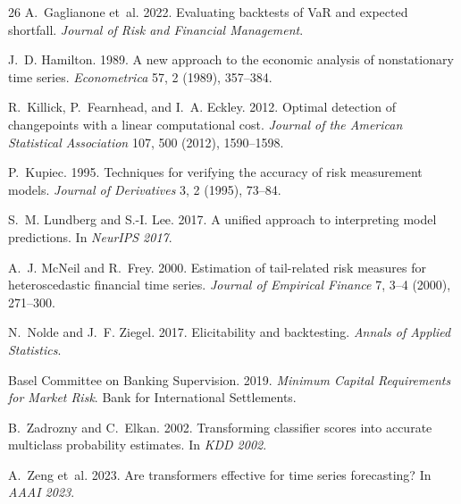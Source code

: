 \documentclass[sigconf]{acmart}
\begin{document}
\begin{thebibliography}{26}
A.~Gaglianone et~al. 2022. Evaluating backtests of VaR and expected shortfall.
\textit{Journal of Risk and Financial Management}.

J.~D. Hamilton. 1989. A new approach to the economic analysis of nonstationary
time series. \textit{Econometrica} 57, 2 (1989), 357--384.

R.~Killick, P.~Fearnhead, and I.~A. Eckley. 2012. Optimal detection of
changepoints with a linear computational cost.
\textit{Journal of the American Statistical Association} 107, 500 (2012),
1590--1598.

P.~Kupiec. 1995. Techniques for verifying the accuracy of risk measurement
models. \textit{Journal of Derivatives} 3, 2 (1995), 73--84.

S.~M. Lundberg and S.-I. Lee. 2017. A unified approach to interpreting model
predictions. In \textit{NeurIPS 2017}.

A.~J. McNeil and R.~Frey. 2000. Estimation of tail-related risk measures for
heteroscedastic financial time series.
\textit{Journal of Empirical Finance} 7, 3--4 (2000), 271--300.

N.~Nolde and J.~F. Ziegel. 2017. Elicitability and backtesting.
\textit{Annals of Applied Statistics}.

Basel Committee on Banking Supervision. 2019.
\textit{Minimum Capital Requirements for Market Risk}.
Bank for International Settlements.

B.~Zadrozny and C.~Elkan. 2002. Transforming classifier scores into accurate
multiclass probability estimates. In \textit{KDD 2002}.

A.~Zeng et~al. 2023. Are transformers effective for time series forecasting?
In \textit{AAAI 2023}.

\end{thebibliography}
\end{document}
